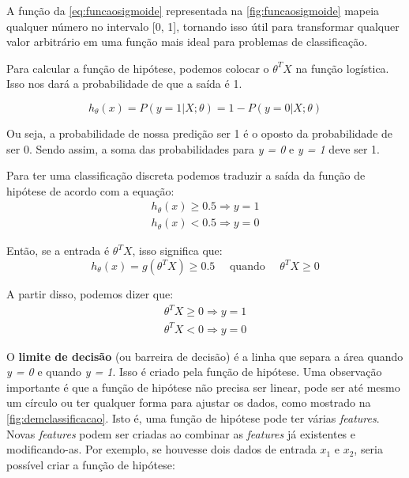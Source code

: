 A função da \autoref{eq:funcaosigmoide} representada na \autoref{fig:funcaosigmoide} mapeia qualquer número no intervalo [0, 1], tornando isso útil para transformar qualquer valor arbitrário em uma função mais ideal para problemas de classificação.

Para calcular a função de hipótese, podemos colocar o $\theta^TX$ na função logística. Isso nos dará a probabilidade de que a saída é 1.

\begin{equation}
h_{\theta}(x) = P(y=1 | X ; \theta) = 1 - P(y=0 | X ; \theta) \nonumber
\end{equation}

Ou seja, a probabilidade de nossa predição ser 1 é o oposto da probabilidade de ser 0. Sendo assim, a soma das probabilidades para \textit{y = 0} e \textit{y = 1} deve ser 1.

Para ter uma classificação discreta podemos traduzir a saída da função de hipótese de acordo com a equação:
\begin{align} 
h_{\theta}(x) \geq 0.5 \Rightarrow y = 1 \nonumber \\
h_{\theta}(x) < 0.5 \Rightarrow y = 0 \nonumber
\end{align}

Então, se a entrada é $\theta^TX$, isso significa que:
\begin{equation}
h_{\theta}(x) = g(\theta^TX) \geq 0.5 \quad \text{ quando } \quad \theta^TX \geq 0 \nonumber
\end{equation}

A partir disso, podemos dizer que:
\begin{align}
\theta^TX \geq 0 \Rightarrow y = 1 \nonumber \\
\theta^TX < 0 \Rightarrow y = 0 \nonumber
\end{align}

O \textbf{limite de decisão} (ou barreira de decisão) é a linha que separa a área quando \textit{y = 0} e quando \textit{y = 1}. Isso é criado pela função de hipótese. Uma observação importante é que a função de hipótese não precisa ser linear, pode ser até mesmo um círculo ou ter qualquer forma para ajustar os dados, como mostrado na \autoref{fig:demclassificacao}. Isto é, uma função de hipótese pode ter várias \textit{features}. Novas \textit{features} podem ser criadas ao combinar as \textit{features} já existentes e modificando-as. Por exemplo, se houvesse dois dados de entrada $x_1$ e $x_2$, seria possível criar a função de hipótese:

